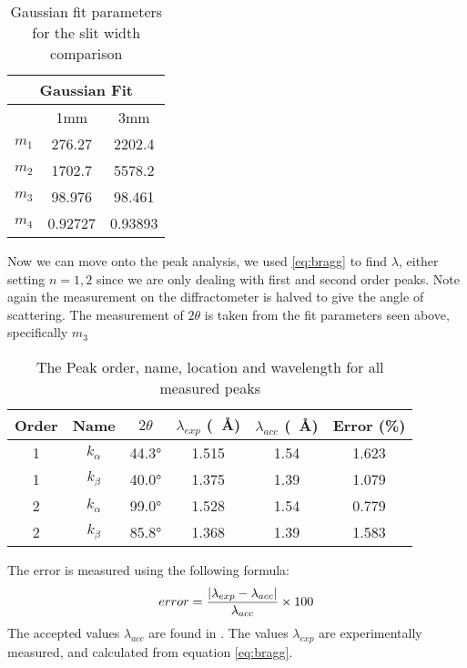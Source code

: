 \documentclass[letterpaper,12pt]{article}
\begin{document}
\begin{table}[H]
\centering
\begin{tabular}{ccc}
\multicolumn{3}{c}{Gaussian Fit}                                    \\ \hline
\multicolumn{1}{c|}{}      & \multicolumn{1}{c|}{1mm}     & 3mm     \\ \hline
\multicolumn{1}{c|}{$m_1$} & \multicolumn{1}{c|}{276.27}  & 2202.4  \\
\multicolumn{1}{c|}{$m_2$} & \multicolumn{1}{c|}{1702.7}  & 5578.2  \\
\multicolumn{1}{c|}{$m_3$} & \multicolumn{1}{c|}{98.976}  & 98.461  \\
\multicolumn{1}{c|}{$m_4$} & \multicolumn{1}{c|}{0.92727} & 0.93893
\end{tabular}
\caption{Gaussian fit parameters for the slit width comparison}
\end{table}
Now we can move onto the peak analysis, we used \eqref{eq:bragg} to find $\lambda$, either setting $n=1,2$ since we are only dealing with first and second order peaks. Note again the measurement on the diffractometer is halved to give the angle of scattering. The measurement of $2\theta$ is taken from the fit parameters seen above, specifically $m_3$
\begin{table}[H]\label{peaks}
\centering
\begin{tabular}{|c|c|c|c|c|c|}
\hline
Order & Name & $2\theta$ & $\lambda_{exp}$ (\SI{}{\angstrom}) & $\lambda_{acc}$ (\SI{}{\angstrom}) & Error (\%) \\ \hline
1 & $k_\alpha$ & \ang{44.3} & 1.515 & 1.54 & 1.623 \\
1 & $k_\beta$  & \ang{40.0} & 1.375 & 1.39 & 1.079 \\
2 & $k_\alpha$ & \ang{99.0} & 1.528 & 1.54 & 0.779 \\
2 & $k_\beta$  & \ang{85.8} & 1.368 & 1.39 & 1.583 \\ \hline
\end{tabular}
\caption{The Peak order, name, location and wavelength for all measured peaks}
\end{table}
The error is measured using the following formula:
\begin{equation*}
  error=\frac{\abs{\lambda_{exp}-\lambda_{acc}}}{\lambda_{acc}}\times 100
\end{equation*}
The accepted values $\lambda_{acc}$ are found in \cite{LIF}. The values $\lambda_{exp}$ are experimentally measured, and calculated from equation \eqref{eq:bragg}.
\end{document}
